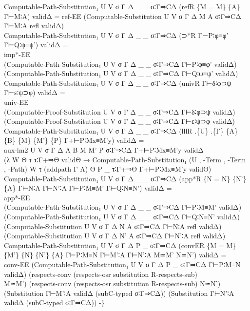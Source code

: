 {\begin{code}
{\>Computable-Path-Substitution₁ U V σ Γ Δ \_ \_ σ∶Γ⇒CΔ (refR \{M = M\} \{A\} Γ⊢M∶A) validΔ = ref-EE (Computable-Substitution U V σ Γ Δ M A σ∶Γ⇒CΔ Γ⊢M∶A refl validΔ)\<\\
\>Computable-Path-Substitution₁ U V σ Γ Δ \_ \_ σ∶Γ⇒CΔ (⊃*R Γ⊢P∶φ≡φ' Γ⊢Q∶ψ≡ψ') validΔ = \<\\
\>  imp*-EE \<\\
\>  (Computable-Path-Substitution₁ U V σ Γ Δ \_ \_ σ∶Γ⇒CΔ Γ⊢P∶φ≡φ' validΔ) \<\\
\>  (Computable-Path-Substitution₁ U V σ Γ Δ \_ \_ σ∶Γ⇒CΔ Γ⊢Q∶ψ≡ψ' validΔ)\<\\
\>Computable-Path-Substitution₁ U V σ Γ Δ \_ \_ σ∶Γ⇒CΔ (univR Γ⊢δ∶φ⊃ψ Γ⊢ε∶ψ⊃φ) validΔ = \<\\
\>  univ-EE \<\\
\>  (Computable-Proof-Substitution U V σ Γ Δ \_ \_ σ∶Γ⇒CΔ Γ⊢δ∶φ⊃ψ validΔ) \<\\
\>  (Computable-Proof-Substitution U V σ Γ Δ \_ \_ σ∶Γ⇒CΔ Γ⊢ε∶ψ⊃φ validΔ)\<\\
\>Computable-Path-Substitution₁ U V σ Γ Δ \_ \_ σ∶Γ⇒CΔ (lllR .\{U\} .\{Γ\} \{A\} \{B\} \{M\} \{M'\} \{P\} Γ+⊢P∶Mx≡M'y) validΔ = \<\\
\>  aux-lm2 U V σ Γ Δ A B M M' P σ∶Γ⇒CΔ Γ+⊢P∶Mx≡M'y validΔ \<\\
\>  (λ W Θ τ τ∶Γ+⇒Θ validΘ → Computable-Path-Substitution₁ (U , -Term , -Term , -Path) W τ (addpath Γ A) Θ P \_ τ∶Γ+⇒Θ Γ+⊢P∶Mx≡M'y validΘ)\<\\
\>Computable-Path-Substitution₁ U V σ Γ Δ \_ \_ σ∶Γ⇒CΔ (app*R \{N = N\} \{N'\} \{A\} Γ⊢N∶A Γ⊢N'∶A Γ⊢P∶M≡M' Γ⊢Q∶N≡N') validΔ = \<\\
\>  app*-EE \<\\
\>  (Computable-Path-Substitution₁ U V σ Γ Δ \_ \_ σ∶Γ⇒CΔ Γ⊢P∶M≡M' validΔ) \<\\
\>  (Computable-Path-Substitution₁ U V σ Γ Δ \_ \_ σ∶Γ⇒CΔ Γ⊢Q∶N≡N' validΔ)\<\\
\>    (Computable-Substitution U V σ Γ Δ N A σ∶Γ⇒CΔ Γ⊢N∶A refl validΔ)\<\\
\>    (Computable-Substitution U V σ Γ Δ N' A σ∶Γ⇒CΔ Γ⊢N'∶A refl validΔ)\<\\
\>Computable-Path-Substitution₁ U V σ Γ Δ P \_ σ∶Γ⇒CΔ (convER \{M = M\} \{M'\} \{N\} \{N'\} \{A\} Γ⊢P∶M≡N Γ⊢M'∶A Γ⊢N'∶A M≃M' N≃N') validΔ = \<\\
\>  conv-EE  (Computable-Path-Substitution₁ U V σ Γ Δ P \_ σ∶Γ⇒CΔ Γ⊢P∶M≡N validΔ) (respects-conv (respects-osr substitution R-respects-sub) \<\\
\>  M≃M') (respects-conv (respects-osr substitution R-respects-sub) N≃N') (Substitution Γ⊢M'∶A validΔ (subC-typed σ∶Γ⇒CΔ)) (Substitution Γ⊢N'∶A validΔ (subC-typed σ∶Γ⇒CΔ)) -\}}\<%
\\
\>\<%
\end{code}
}
